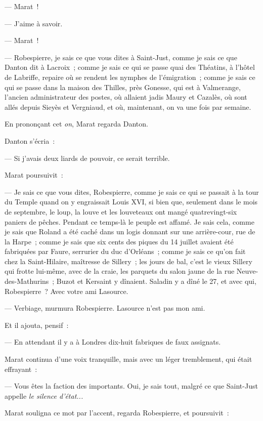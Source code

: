 \documentclass[french,twoside]{book} %
\begin{document}
— Marat !\par
— J’aime à savoir.\par
— Marat !\par
— Robespierre, je sais ce que vous dites à Saint-Just, comme je sais ce que Danton dit à Lacroix ; comme je sais ce qui se passe quai des Théatins, à l’hôtel de Labriffe, repaire où se rendent les nymphes de l’émigration ; comme je sais ce qui se passe dans la maison des Thilles, près Gonesse, qui est à Valmerange, l’ancien administrateur des postes, où allaient jadis Maury et Cazalès, où sont allés depuis Sieyès et Vergniaud, et où, maintenant, on va une fois par semaine.\par
 En prononçant cet \emph{on}, Marat regarda Danton.\par
Danton s’écria :\par
— Si j’avais deux liards de pouvoir, ce serait terrible.\par
Marat poursuivit :\par
— Je sais ce que vous dites, Robespierre, comme je sais ce qui se passait à la tour du Temple quand on y engraissait Louis XVI, si bien que, seulement dans le mois de septembre, le loup, la louve et les louveteaux ont mangé quatrevingt-six paniers de pêches. Pendant ce temps-là le peuple est affamé. Je sais cela, comme je sais que Roland a été caché dans un logis donnant sur une arrière-cour, rue de la Harpe ; comme je sais que six cents des piques du 14 juillet avaient été fabriquées par Faure, serrurier du duc d’Orléans ; comme je sais ce qu’on fait chez la Saint-Hilaire, maîtresse de Sillery ; les jours de bal, c’est le vieux Sillery qui frotte lui-même, avec de la craie, les parquets du salon jaune de la rue Neuve-des-Mathurins ; Buzot et Kersaint y dînaient. Saladin y a dîné le 27, et avec qui, Robespierre ? Avec votre ami Lasource.\par
— Verbiage, murmura Robespierre. Lasource n’est pas mon ami.\par
Et il ajouta, pensif :\par
— En attendant il y a à Londres dix-huit fabriques de faux assignats.\par
Marat continua d’une voix tranquille, mais avec un léger tremblement, qui était effrayant :\par
— Vous êtes la faction des importants. Oui, je  sais tout, malgré ce que Saint-Just appelle \emph{le silence d’état...}\par
Marat souligna ce mot par l’accent, regarda Robespierre, et poursuivit :\par
\end{document}
